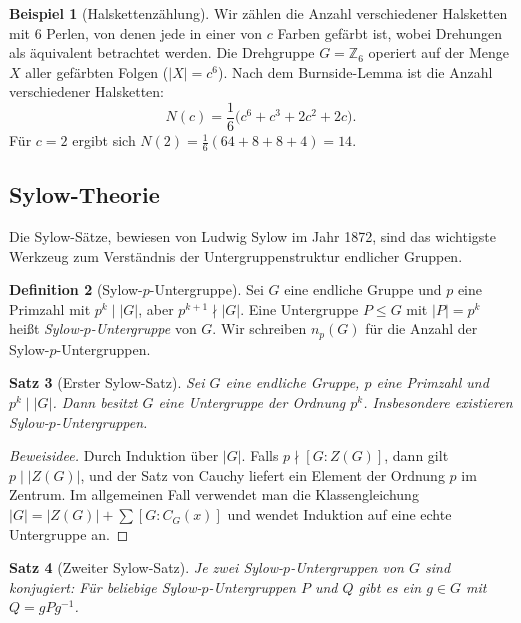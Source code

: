 \documentclass[12pt,a4paper]{amsart}
\newtheorem{theorem}{Satz}[section]
\theoremstyle{definition}
\newtheorem{definition}[theorem]{Definition}
\newtheorem{example}[theorem]{Beispiel}
\begin{document}
\begin{example}[Halskettenzählung]
Wir zählen die Anzahl verschiedener Halsketten mit 6 Perlen, von denen jede in einer von
$c$ Farben gefärbt ist, wobei Drehungen als äquivalent betrachtet werden. Die
Drehgruppe $G = \mathbb{Z}_6$ operiert auf der Menge $X$ aller gefärbten Folgen
($|X| = c^6$). Nach dem Burnside-Lemma ist die Anzahl verschiedener Halsketten:
\[
  N(c) = \frac{1}{6}\bigl(c^6 + c^3 + 2c^2 + 2c\bigr).
\]
Für $c = 2$ ergibt sich $N(2) = \tfrac{1}{6}(64 + 8 + 8 + 4) = 14$.
\end{example}

\subsection{Sylow-Theorie}

Die Sylow-Sätze, bewiesen von Ludwig Sylow im Jahr 1872, sind das wichtigste Werkzeug
zum Verständnis der Untergruppenstruktur endlicher Gruppen.

\begin{definition}[Sylow-$p$-Untergruppe]
Sei $G$ eine endliche Gruppe und $p$ eine Primzahl mit $p^k \mid |G|$, aber
$p^{k+1} \nmid |G|$. Eine Untergruppe $P \leq G$ mit $|P| = p^k$ heißt
\emph{Sylow-$p$-Untergruppe} von $G$. Wir schreiben $n_p(G)$ für die Anzahl der
Sylow-$p$-Untergruppen.
\end{definition}

\begin{theorem}[Erster Sylow-Satz]
\label{thm:sylow1}
Sei $G$ eine endliche Gruppe, $p$ eine Primzahl und $p^k \mid |G|$. Dann besitzt $G$
eine Untergruppe der Ordnung $p^k$. Insbesondere existieren Sylow-$p$-Untergruppen.
\end{theorem}

\begin{proof}[Beweisidee]
Durch Induktion über $|G|$. Falls $p \nmid [G:Z(G)]$, dann gilt $p \mid |Z(G)|$, und
der Satz von Cauchy liefert ein Element der Ordnung $p$ im Zentrum. Im allgemeinen Fall
verwendet man die Klassengleichung
$|G| = |Z(G)| + \sum [G:C_G(x)]$ und wendet Induktion auf eine echte Untergruppe an.
\end{proof}

\begin{theorem}[Zweiter Sylow-Satz]
\label{thm:sylow2}
Je zwei Sylow-$p$-Untergruppen von $G$ sind konjugiert: Für beliebige
Sylow-$p$-Untergruppen $P$ und $Q$ gibt es ein $g \in G$ mit $Q = gPg^{-1}$.
\end{theorem}
\end{document}

